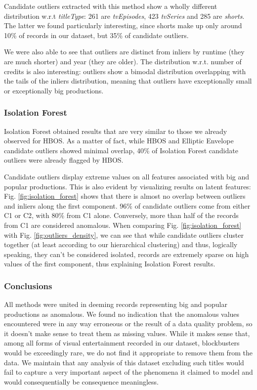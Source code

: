Candidate outliers extracted with this method show a wholly different distribution w.r.t \textit{titleType}: 261 are \textit{tvEpisodes}, 423 \textit{tvSeries} and 285 are \textit{shorts}.
The latter we found particularly interesting, since shorts make up only around 10\% of records in our dataset, but 35\% of candidate outliers.

We were also able to see that outliers are distinct from inliers by runtime (they are much shorter) and year (they are older).
The distribution w.r.t. number of credits is also interesting: outliers show a bimodal distribution overlapping with the tails of the inliers distribution, meaning that outliers have exceptionally small or exceptionally big productions.

\subsubsection{Isolation Forest}
Isolation Forest obtained results that are very similar to those we already observed for HBOS.
As a matter of fact, while HBOS and Elliptic Envelope candidate outliers showed minimal overlap, 40\% of Isolation Forest candidate outliers were already flagged by HBOS.

Candidate outliers display extreme values on all features associated with big and popular productions.
This is also evident by visualizing results on latent features: Fig. \ref{fig:isolation_forest} shows that there is almost no overlap between outliers and inliers along the first component.
96\% of candidate outliers come from either C1 or C2, with 80\% from C1 alone.
Conversely, more than half of the records from C1 are considered anomalous.
When comparing Fig. \ref{fig:isolation_forest} with Fig. \ref{fig:outliers_density}, we can see that while candidate outliers cluster together (at least according to our hierarchical clustering) and thus, logically speaking, they can't be considered isolated, records are extremely sparse on high values of the first component, thus explaining Isolation Forest results.

\subsubsection{Conclusions}
All methods were united in deeming records representing big and popular productions as anomalous.
We found no indication that the anomalous values encountered were in any way erroneous or the result of a data quality problem, so it doesn't make sense to treat them as missing values.
While it makes sense that, among all forms of visual entertainment recorded in our dataset, blockbusters would be exceedingly rare, we do not find it appropriate to remove them from the data.
We maintain that any analysis of this dataset excluding such titles would fail to capture a very important aspect of the phenomena it claimed to model and would consequentially be consequence meaningless.
